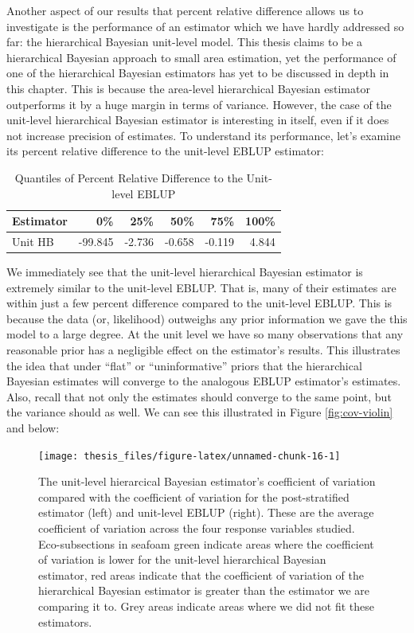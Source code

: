 \documentclass[12pt,twoside]{reedthesis}
\begin{document}
Another aspect of our results that percent relative difference allows us to investigate is the performance of an estimator which we have hardly addressed so far: the hierarchical Bayesian unit-level model. This thesis claims to be a hierarchical Bayesian approach to small area estimation, yet the performance of one of the hierarchical Bayesian estimators has yet to be discussed in depth in this chapter. This is because the area-level hierarchical Bayesian estimator outperforms it by a huge margin in terms of variance. However, the case of the unit-level hierarchical Bayesian estimator is interesting in itself, even if it does not increase precision of estimates. To understand its performance, let's examine its percent relative difference to the unit-level EBLUP estimator:
\begin{longtable}[t]{lrrrrr}
\caption{\label{tab:prd-unit}Quantiles of Percent Relative Difference to the Unit-level EBLUP}\\
\toprule
Estimator & 0\% & 25\% & 50\% & 75\% & 100\%\\
\midrule
Unit HB & -99.845 & -2.736 & -0.658 & -0.119 & 4.844\\
\bottomrule
\end{longtable}
We immediately see that the unit-level hierarchical Bayesian estimator is extremely similar to the unit-level EBLUP. That is, many of their estimates are within just a few percent difference compared to the unit-level EBLUP. This is because the data (or, likelihood) outweighs any prior information we gave the this model to a large degree. At the unit level we have so many observations that any reasonable prior has a negligible effect on the estimator's results. This illustrates the idea that under ``flat'' or ``uninformative'' priors that the hierarchical Bayesian estimates will converge to the analogous EBLUP estimator's estimates. Also, recall that not only the estimates should converge to the same point, but the variance should as well. We can see this illustrated in Figure \ref{fig:cov-violin} and below:
\clearpage
\begin{figure}

{\centering \texttt{[image: thesis\_files/figure-latex/unnamed-chunk-16-1]} 

}

\caption[Unit-level coefficient of variation comparison across the Interior West]{The unit-level hierarcical Bayesian estimator's coefficient of variation compared with the coefficient of variation for the post-stratified estimator (left) and unit-level EBLUP (right). These are the average coefficient of variation across the four response variables studied. Eco-subsections in seafoam green indicate areas where the coefficient of variation is lower for the unit-level hierarchical Bayesian estimator, red areas indicate that the coefficient of variation of the hierarchical Bayesian estimator is greater than the estimator we are comparing it to. Grey areas indicate areas where we did not fit these estimators.}\label{fig:unnamed-chunk-16}
\end{figure}
\end{document}
